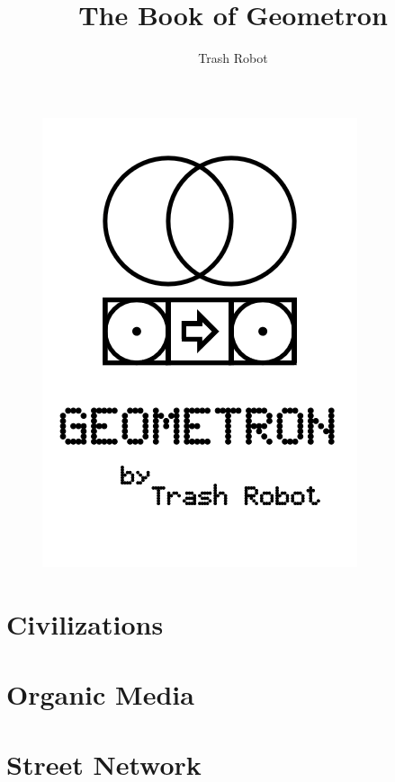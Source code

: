 \documentclass[ebook,12pt,openany]{memoir} %
\title{The Book of Geometron}
\author{Trash Robot}
\begin{document}
\frontmatter
\begin{figure}[htbp]
\centering
\includegraphics{cover.png}
\end{figure}

\clearpage

\clearpage

\newpage
\thispagestyle{empty}
\mbox{}

\maketitle

\tableofcontents

\listoffigures 

%

\mainmatter

\chapter{Civilizations}

\chapter{Organic Media}

\chapter{Street Network}

\end{document}
